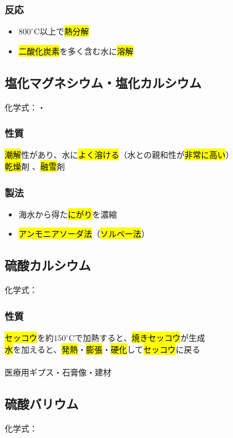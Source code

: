 \subsubsection{反応}
\begin{itemize}
  \item $800^{\circ}$C以上で\hl{熱分解}\\
  \item \hl{二酸化炭素}を多く含む水に\hl{溶解}\\
\end{itemize}
\subsection{塩化マグネシウム・塩化カルシウム}
化学式：\hl{}・\hl{}
\subsubsection{性質}
\hl{潮解}性があり、水に\hl{よく溶ける}（水との親和性が\hl{非常に高い}）\\
\hl{乾燥}剤 、\hl{融雪}剤
\subsubsection{製法}
\begin{itemize}
  \item 海水から得た\hl{にがり}を濃縮  \K
  \item \hl{アンモニアソーダ法}（\hl{ソルベー法}） \K
\end{itemize}
\newpage
\subsection{硫酸カルシウム}
化学式：\hl{}
\subsubsection{性質}
\hl{セッコウ}を約$150^{\circ}$Cで加熱すると、\hl{焼きセッコウ}が生成\\
\hl{水}を加えると、\hl{発熱}・\hl{膨張}・\hl{硬化}して\hl{セッコウ}に戻る\\
\\
 医療用ギプス・石膏像・建材
\subsection{硫酸バリウム}
化学式：\hl{}
